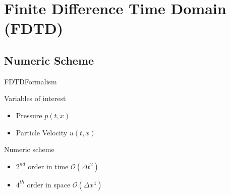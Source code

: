 \documentclass[9pt, xcolor={usenames, dvipsnames}]{beamer}
\begin{document}
		\section{Finite Difference Time Domain (FDTD)}

			\subsection{Numeric Scheme}

				\begin{frame}{FDTD}{Formalism}
					\centering
					\begin{minipage}[c]{0.45\textwidth}
						\begin{block}{Variables of interest}
							\begin{itemize}
								\item Pressure $p(t, x)$ \\
								\item Particle Velocity $u(t, x)$
							\end{itemize}
						\end{block}
						\begin{block}{Numeric scheme}
							\begin{itemize}
								\item $2^{nd}$ order in time $\mathcal{O}(\Delta t^2)$~\cite{blacnh1994FDTD} \\
								\item $4^{th}$ order in space $\mathcal{O}(\Delta x^4)$~\cite{blacnh1994FDTD}
							\end{itemize}
						\end{block}


\end{minipage}
\end{frame}
\end{document}
